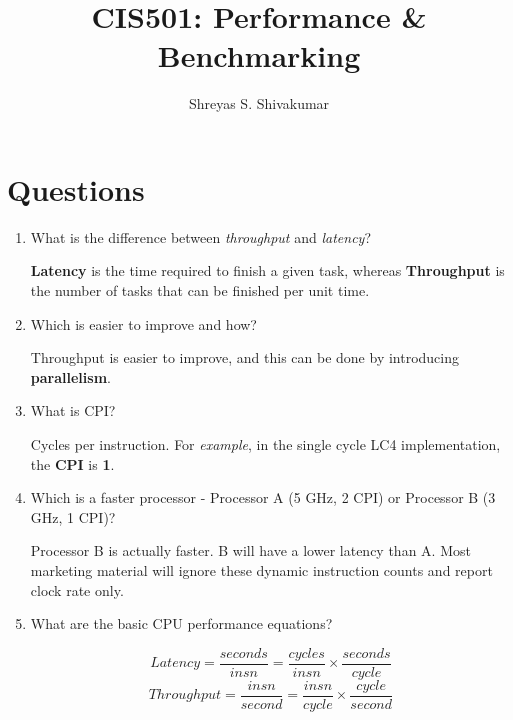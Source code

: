\documentclass[12pt]{article}
\title{CIS501: Performance \& Benchmarking}
\author[1]{Shreyas S. Shivakumar}
\newenvironment{QandA}{\begin{enumerate}[label=\bfseries\arabic*.]\bfseries}
                      {\end{enumerate}}
\newenvironment{answered}{\par\quad\normalfont}{}
\begin{document}
\maketitle

\section{Questions}

\begin{QandA}
   \item What is the difference between \textit{throughput} and \textit{latency}?
        \begin{answered}
        \textbf{Latency} is the time required to finish a given task, whereas \textbf{Throughput} is the number of tasks that can be finished per unit time.
        \end{answered}
        
    \item Which is easier to improve and how?
        \begin{answered}
        Throughput is easier to improve, and this can be done by introducing \textbf{parallelism}.
        \end{answered}
        
    \item What is CPI?
        \begin{answered}
        Cycles per instruction. For \textit{example}, in the single cycle LC4 implementation, the \textbf{CPI} is \textbf{1}.
        \end{answered}
        
    \item Which is a faster processor - Processor A (5 GHz, 2 CPI) or Processor B (3 GHz, 1 CPI)?
        \begin{answered}
        Processor B is actually faster. B will have a lower latency than A. Most marketing material will ignore these dynamic instruction counts and report clock rate only.
        \end{answered}
        
    \item What are the basic CPU performance equations?
        \begin{answered}
        \begin{equation}
            Latency = \frac{seconds}{insn} = \frac{cycles}{insn} \times \frac{seconds}{cycle}
        \end{equation}
        \begin{equation}
            Throughput = \frac{insn}{second} = \frac{insn}{cycle} \times \frac{cycle}{second}
        \end{equation}        
        \end{answered}


\end{QandA}
\end{document}
